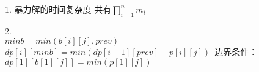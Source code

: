 \documentclass{article}
\begin{document}
1. 暴力解的时间复杂度
共有$\displaystyle\prod_{i = 1}^n m_i$

2.\\ 
$minb = min(b[i][j], prev)$\\
$dp[i][minb] = min(dp[i - 1][prev] + p[i][j])$\
边界条件：$dp[1][b[1][j]] = min(p[1][j])$
\end{document}
